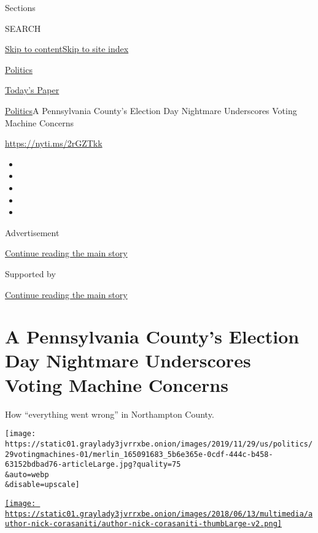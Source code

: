 Sections

SEARCH

\protect\hyperlink{site-content}{Skip to
content}\protect\hyperlink{site-index}{Skip to site index}

\href{https://www.nytimes3xbfgragh.onion/section/politics}{Politics}

\href{https://myaccount.nytimes3xbfgragh.onion/auth/login?response_type=cookie\&client_id=vi}{}

\href{https://www.nytimes3xbfgragh.onion/section/todayspaper}{Today's
Paper}

\href{/section/politics}{Politics}\textbar{}A Pennsylvania County's
Election Day Nightmare Underscores Voting Machine Concerns

\url{https://nyti.ms/2rGZTkk}

\begin{itemize}
\item
\item
\item
\item
\item
\end{itemize}

Advertisement

\protect\hyperlink{after-top}{Continue reading the main story}

Supported by

\protect\hyperlink{after-sponsor}{Continue reading the main story}

\hypertarget{a-pennsylvania-countys-election-day-nightmare-underscores-voting-machine-concerns}{%
\section{A Pennsylvania County's Election Day Nightmare Underscores
Voting Machine
Concerns}\label{a-pennsylvania-countys-election-day-nightmare-underscores-voting-machine-concerns}}

How ``everything went wrong'' in Northampton County.

\texttt{[image: https://static01.graylady3jvrrxbe.onion/images/2019/11/29/us/politics/29votingmachines-01/merlin\_165091683\_5b6e365e-0cdf-444c-b458-63152bdbad76-articleLarge.jpg?quality=75\\\&auto=webp\\\&disable=upscale]}

\href{https://www.nytimes3xbfgragh.onion/by/nick-corasaniti}{\texttt{[image: https://static01.graylady3jvrrxbe.onion/images/2018/06/13/multimedia/author-nick-corasaniti/author-nick-corasaniti-thumbLarge-v2.png]}}

